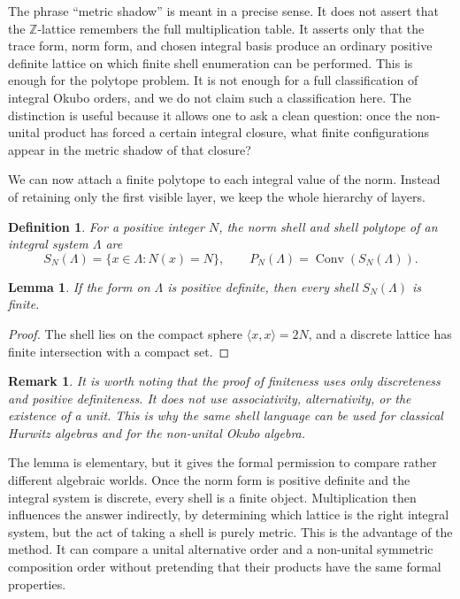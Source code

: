 \documentclass{birkjour}
\newtheorem{lemma}[theorem]{Lemma}
\newtheorem{definition}[theorem]{Definition}
\newtheorem{remark}[theorem]{Remark}
\newcommand{\ZZ}{\mathbb Z}
\newcommand{\Conv}{\operatorname{Conv}}
\numberwithin{equation}{section}
\begin{document}
The phrase ``metric shadow'' is meant in a precise sense. It does
not assert that the \(\ZZ\)-lattice remembers the full multiplication table.
It asserts only that the trace form, norm form, and chosen integral basis
produce an ordinary positive definite lattice on which finite shell
enumeration can be performed. This is enough for the polytope problem. It is
not enough for a full classification of integral Okubo orders, and we do not
claim such a classification here. The distinction is useful because it allows
one to ask a clean question: once the non-unital product has forced a certain
integral closure, what finite configurations appear in the metric shadow of
that closure?


We can now attach a finite polytope to each integral value of the norm. Instead
of retaining only the first visible layer, we keep the whole hierarchy of
layers.

\begin{definition}
For a positive integer \(N\), the norm shell and shell polytope of an integral
system \(\Lambda\) are
\begin{equation}
S_N(\Lambda)=\{x\in\Lambda:N(x)=N\},
\qquad
P_N(\Lambda)=\Conv(S_N(\Lambda)).
\end{equation}
\end{definition}

\begin{lemma}
If the form on \(\Lambda\) is positive definite, then every shell
\(S_N(\Lambda)\) is finite.
\end{lemma}

\begin{proof}
The shell lies on the compact sphere \(\langle x,x\rangle=2N\), and a discrete
lattice has finite intersection with a compact set.
\end{proof}

\begin{remark}
It is worth noting that the proof of finiteness uses only discreteness and
positive definiteness. It does not use associativity, alternativity, or the
existence of a unit. This is why the same shell language can be used for
classical Hurwitz algebras and for the non-unital Okubo algebra.
\end{remark}

The lemma is elementary, but it gives the formal permission to compare rather
different algebraic worlds. Once the norm form is positive definite and the
integral system is discrete, every shell is a finite object. Multiplication
then influences the answer indirectly, by determining which lattice is the
right integral system, but the act of taking a shell is purely metric. This is
the advantage of the method. It can compare a unital alternative order and a
non-unital symmetric composition order without pretending that their products
have the same formal properties.
\end{document}
